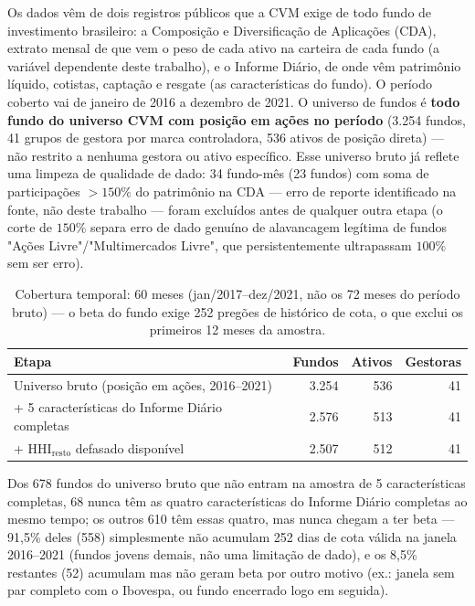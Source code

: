 \documentclass[11pt,a4paper]{article}
\begin{document}
Os dados vêm de dois registros públicos que a CVM exige de todo fundo de investimento
brasileiro: a Composição e Diversificação de Aplicações (CDA), extrato mensal de que vem o peso
de cada ativo na carteira de cada fundo (a variável dependente deste trabalho), e o Informe
Diário, de onde vêm patrimônio líquido, cotistas, captação e resgate (as características do
fundo). O período coberto vai de janeiro de 2016 a dezembro de 2021. O universo de fundos é
\textbf{todo fundo do universo CVM com posição em ações no período} (3.254 fundos, 41 grupos de
gestora por marca controladora, 536 ativos de posição direta) --- não restrito a nenhuma gestora
ou ativo específico. Esse universo bruto já reflete uma limpeza de qualidade de dado: 34
fundo-mês (23 fundos) com soma de participações $>150\%$ do patrimônio na CDA --- erro de
reporte identificado na fonte, não deste trabalho --- foram excluídos antes de qualquer outra
etapa (o corte de $150\%$ separa erro de dado genuíno de alavancagem legítima de fundos
"Ações Livre"/"Multimercados Livre", que persistentemente ultrapassam $100\%$ sem ser erro).

\begin{table}[h]\centering\small
\caption{Funil da amostra, do universo bruto à amostra final. Fonte: scripts
\texttt{50}--\texttt{58} $\to$ \texttt{painel\_universo\_completo\_final.csv}; script
\texttt{101\_cross\_section\_universo\_completo\_hhi.R} para a etapa de
$\text{HHI}_{\text{resto}}$.}
\label{tab:universo}
\begin{tabular}{@{}p{7.6cm}rrr@{}}
\toprule
Etapa & Fundos & Ativos & Gestoras \\
\midrule
Universo bruto (posição em ações, 2016--2021) & 3.254 & 536 & 41 \\
+ 5 características do Informe Diário completas & 2.576 & 513 & 41 \\
+ $\text{HHI}_{\text{resto}}$ defasado disponível & 2.507 & 512 & 41 \\
\bottomrule
\end{tabular}
\caption*{\footnotesize Cobertura temporal: 60 meses (jan/2017--dez/2021, não os 72 meses do
período bruto) --- o beta do fundo exige 252 pregões de histórico de cota, o que exclui os
primeiros 12 meses da amostra.}
\end{table}

Dos 678 fundos do universo bruto que não entram na amostra de 5 características completas, 68
nunca têm as quatro características do Informe Diário completas ao mesmo tempo; os outros 610
têm essas quatro, mas nunca chegam a ter beta --- 91,5\% deles (558) simplesmente não acumulam
252 dias de cota válida na janela 2016--2021 (fundos jovens demais, não uma limitação de dado), e
os 8,5\% restantes (52) acumulam mas não geram beta por outro motivo (ex.: janela sem par
completo com o Ibovespa, ou fundo encerrado logo em seguida).
\end{document}
